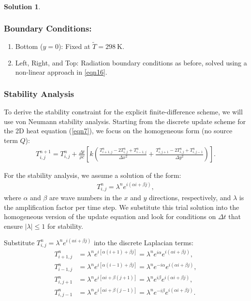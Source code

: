 \documentclass[12pt]{article}
\theoremstyle{definition} %
\newtheorem{solution}{Solution}
\theoremstyle{plain} %
\begin{document}
\begin{solution}
            \subsubsection*{Boundary Conditions:}  
            \begin{enumerate}
            \item Bottom ($y=0$): Fixed at $\tilde{T}=298\ \text{K}$.  
            \item Left, Right, and Top: Radiation boundary conditions as before, solved using a non-linear approach in \autoref{eqn16}.
            \end{enumerate}
        
            \subsubsection*{Stability Analysis}  
            \noindent To derive the stability constraint for the explicit finite-difference scheme, we will use von Neumann stability analysis. Starting from the discrete update scheme for the 2D heat equation (\autoref{eqn7}), we focus on the homogeneous form (no source term $Q$):
\begin{align}
T_{i,j}^{n+1} = T_{i,j}^n + \frac{\Delta t}{\rho c}\left[ k \left( \frac{T_{i+1,j}^n - 2T_{i,j}^n + T_{i-1,j}^n}{\Delta x^2} + \frac{T_{i,j+1}^n - 2T_{i,j}^n + T_{i,j-1}^n}{\Delta y^2}\right) \right].
\end{align}

\noindent For the stability analysis, we assume a solution of the form:
\begin{align}
T_{i,j}^n = \lambda^n e^{i(\alpha i + \beta j)},
\end{align}
where $\alpha$ and $\beta$ are wave numbers in the $x$ and $y$ directions, respectively, and $\lambda$ is the amplification factor per time step. We substitute this trial solution into the homogeneous version of the update equation and look for conditions on $\Delta t$ that ensure $|\lambda| \leq 1$ for stability.

\noindent Substitute $T_{i,j}^n = \lambda^n e^{i(\alpha i + \beta j)}$ into the discrete Laplacian terms:
\begin{align*}
T_{i+1,j}^n &= \lambda^n e^{i[\alpha(i+1) + \beta j]} = \lambda^n e^{i\alpha}e^{i(\alpha i + \beta j)}, \\
T_{i-1,j}^n &= \lambda^n e^{i[\alpha(i-1) + \beta j]} = \lambda^n e^{-i\alpha}e^{i(\alpha i + \beta j)}, \\
T_{i,j+1}^n &= \lambda^n e^{i[\alpha i + \beta (j+1)]} = \lambda^n e^{i\beta}e^{i(\alpha i + \beta j)}, \\
T_{i,j-1}^n &= \lambda^n e^{i[\alpha i + \beta (j-1)]} = \lambda^n e^{-i\beta}e^{i(\alpha i + \beta j)}.
\end{align*}


\end{solution}
\end{document}
